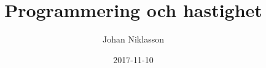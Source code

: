 \documentclass{report}
\begin{document}
\title{Programmering och hastighet}
\author{Johan Niklasson}
\date{2017-11-10}
\maketitle
\end{document}

